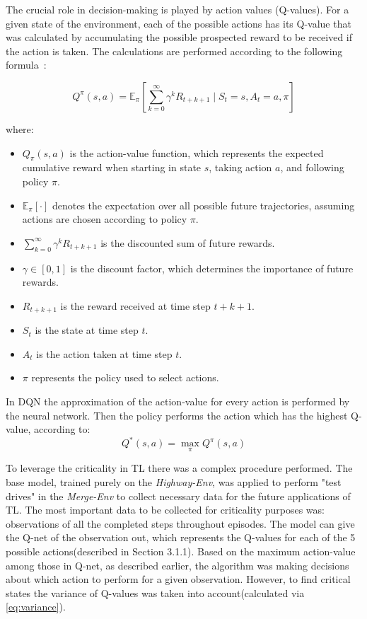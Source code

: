 The crucial role in decision-making is played by action values (Q-values). For a given state of the environment, each of the possible actions has its Q-value that was calculated by accumulating the possible prospected reward to be received if the action is taken. The calculations are performed according to the following formula~\cite{xue2023dvqn}:

\begin{equation}
Q^\pi(s, a) = \mathbb{E}_\pi \left[ \sum_{k=0}^\infty \gamma^k R_{t+k+1} \mid S_t = s, A_t = a, \pi \right]
\label{eq:q_value}
\end{equation}

where:
\begin{itemize}
    \item \( Q_\pi(s, a) \) is the action-value function, which represents the expected cumulative reward when starting in state \( s \), taking action \( a \), and following policy \( \pi \).
    \item \( \mathbb{E}_\pi [\cdot] \) denotes the expectation over all possible future trajectories, assuming actions are chosen according to policy \( \pi \).
    \item \( \sum_{k=0}^\infty \gamma^k R_{t+k+1} \) is the discounted sum of future rewards.
    \item \( \gamma \in [0,1] \) is the discount factor, which determines the importance of future rewards.
    \item \( R_{t+k+1} \) is the reward received at time step \( t+k+1 \).
    \item \( S_t \) is the state at time step \( t \).
    \item \( A_t \) is the action taken at time step \( t \).
    \item \( \pi \) represents the policy used to select actions.
\end{itemize}

In DQN the approximation of the action-value for every action is performed by the neural network. Then the policy performs the action which has the highest Q-value, according to:
\begin{equation}
 Q^*(s, a) = \max_\pi Q^\pi(s, a)
    \label{eq:max_q_value}
\end{equation}

To leverage the criticality in TL there was a complex procedure performed. The base model, trained purely on the \emph{Highway-Env}, was applied to perform "test drives" in the \emph{Merge-Env} to collect necessary data for the future applications of TL. The most important data to be collected for criticality purposes was: observations of all the completed steps throughout episodes. The model can give the Q-net of the observation out, which represents the Q-values for each of the 5 possible actions(described in Section 3.1.1). Based on the maximum action-value among those in Q-net, as described earlier, the algorithm was making decisions about which action to perform for a given observation. However, to find critical states the variance of Q-values was taken into account(calculated via \ref{eq:variance}).

